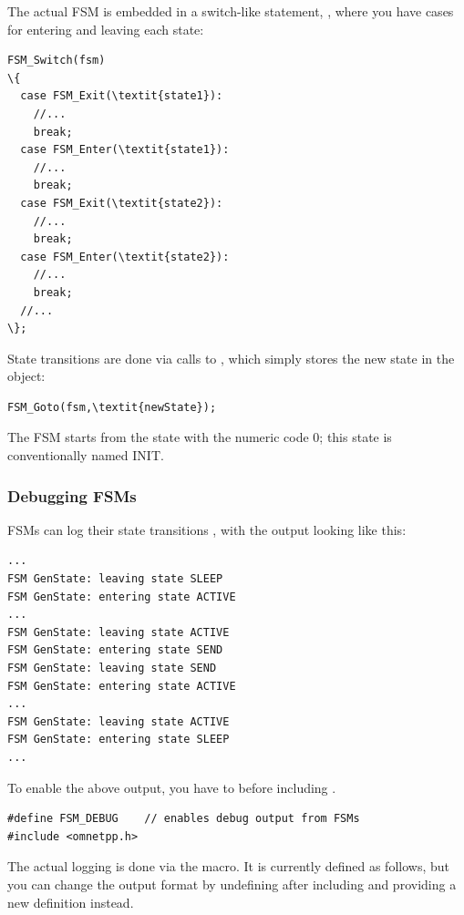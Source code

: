 The actual FSM is embedded in a switch-like statement,
, where you have cases for entering and leaving
each state:


\begin{Verbatim}[commandchars=\\\{\}]
FSM_Switch(fsm)
\{
  case FSM_Exit(\textit{state1}):
    //...
    break;
  case FSM_Enter(\textit{state1}):
    //...
    break;
  case FSM_Exit(\textit{state2}):
    //...
    break;
  case FSM_Enter(\textit{state2}):
    //...
    break;
  //...
\};
\end{Verbatim}


State transitions are done via calls to
, which simply stores the new state in the
 object:

\begin{Verbatim}[commandchars=\\\{\}]
FSM_Goto(fsm,\textit{newState});
\end{Verbatim}

The FSM starts from the state with the numeric code 0; this state
is conventionally named INIT.


\subsubsection{Debugging FSMs}

FSMs can log their state transitions ,
with the output looking like this:

\begin{verbatim}
...
FSM GenState: leaving state SLEEP
FSM GenState: entering state ACTIVE
...
FSM GenState: leaving state ACTIVE
FSM GenState: entering state SEND
FSM GenState: leaving state SEND
FSM GenState: entering state ACTIVE
...
FSM GenState: leaving state ACTIVE
FSM GenState: entering state SLEEP
...
\end{verbatim}

To enable the above output, you have to 
before including .

\begin{Verbatim}[commandchars=\\\{\}]
#define FSM_DEBUG    // enables debug output from FSMs
#include <omnetpp.h>
\end{Verbatim}

The actual logging is done via the  macro.
It is currently defined as follows, but you can change the
output format by undefining  after including
 and providing a new definition instead.

